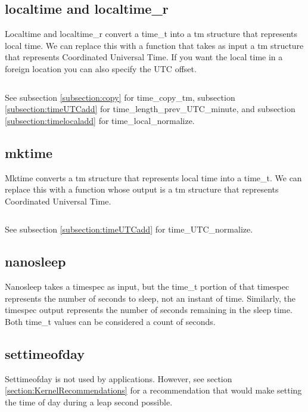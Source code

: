 \documentclass[letterpaper,twoside]{article}
\begin{document}
\subsection{localtime and localtime\_r}
\label{subsection:localtime}
Localtime and localtime\_r convert a {\ttfamily time\_t} into
a {\ttfamily tm} structure that
represents local time.  We can replace this with a function that takes
as input a {\ttfamily tm} structure that represents Coordinated Universal Time.
If you want the local time in a foreign location you can also specify
the UTC offset.
\inputminted[firstline=32]{c}{src/time_utc_to_local.c}
See subsection \ref{subsection:copy} for time\_copy\_tm,
subsection \ref{subsection:timeUTCadd} for
time\_\-length\_\-prev\_\-UTC\_\-minute,
and subsection \ref{subsection:timelocaladd} for time\_local\_normalize.

\subsection{mktime}
\label{subsection:mktime}
Mktime converts a {\ttfamily tm} structure that represents local time into a
{\ttfamily time\_t}.  We can replace this with a function whose output is a
{\ttfamily tm} structure that represents Coordinated Universal Time.
\inputminted[firstline=32]{c}{src/time_local_to_utc.c}
See subsection \ref{subsection:timeUTCadd} for time\_UTC\_normalize.

\subsection{nanosleep}
Nanosleep takes a timespec as input, but the {\ttfamily time\_t} portion of that
timespec represents the number of seconds to sleep, not an instant of
time.  Similarly, the timespec output represents the number of seconds
remaining in the sleep time.  Both {\ttfamily time\_t} values can be considered
a count of seconds.

\subsection{settimeofday}
Settimeofday is not used by applications.
However, see section \ref{section:KernelRecommendations} for a recommendation
that would make setting the time of day during a leap second possible.
\end{document}
